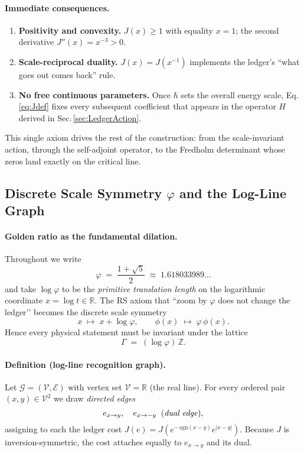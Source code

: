 \documentclass[11pt]{article}
\begin{document}
\paragraph{Immediate consequences.}
\begin{enumerate}
\item \textbf{Positivity and convexity.}\;
      \(J(x)\ge1\) with equality \(x=1\); the second derivative
      \(J''(x)=x^{-3}>0\).
\item \textbf{Scale-reciprocal duality.}\;
      \(J(x)=J(x^{-1})\) implements the ledger’s
      “what goes out comes back” rule.
\item \textbf{No free continuous parameters.}\;
      Once \(\hbar\) sets the overall energy scale,
      Eq.\,\eqref{eq:Jdef} fixes every subsequent coefficient that
      appears in the operator $H$ derived in
      Sec.\,\ref{sec:LedgerAction}.
\end{enumerate}

\vspace{0.5em}
\noindent
This single axiom drives the rest of the construction: from the
scale-invariant action, through the self-adjoint operator, to the
Fredholm determinant whose zeros land exactly on the critical line.

\subsection{Discrete Scale Symmetry $\varphi$ and the Log-Line Graph}
\label{sec:LogLine}

\paragraph{Golden ratio as the fundamental dilation.}
Throughout we write
\[
   \varphi \;=\;\frac{1+\sqrt5}{2}\;\approx\;1.618033989\ldots
\]
and take $\log\varphi$ to be the \emph{primitive translation length} on
the logarithmic coordinate $x=\log t\in\mathbb R$.
The RS axiom that “zoom by $\varphi$ does not change the ledger’’
becomes the discrete scale symmetry
\begin{equation}
\label{eq:dilation}
   x \;\longmapsto\; x+\log\varphi,
   \qquad
   \phi(x) \;\longmapsto\; \varphi\,\phi(x).
\end{equation}
Hence every physical statement must be invariant under the lattice
\[
   \Gamma \;=\; (\log\varphi)\,\mathbb Z.
\]

\paragraph{Definition (log-line recognition graph).}
Let $\mathcal G=(\mathcal V,\mathcal E)$ with vertex set
$\mathcal V=\mathbb R$ (the real line).  
For every ordered pair $(x,y)\in\mathcal V^{2}$ we draw
\emph{directed edges}
\[
   e_{x\to y},\quad
   e_{x\to -y}\;\;\text{(\emph{dual edge})},
\]
assigning to each the ledger cost $J(e)=J(e^{-\,\mathrm{sgn}(x-y)}e^{|x-y|})$.
Because $J$ is inversion-symmetric, the cost attaches equally to
$e_{x\to y}$ and its dual.
\end{document}
